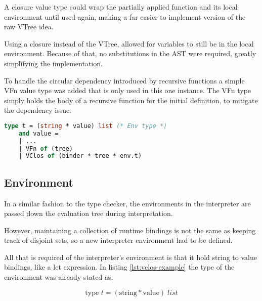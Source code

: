 \documentclass{l4proj}
\begin{document}
A closure value type could wrap the partially applied function and its local environment until used again, making a far easier to implement version of the raw VTree idea.

Using a closure instead of the VTree, allowed for variables to still be in the local environment.
Because of that, no substitutions in the AST were required, greatly simplifying the implementation.


To handle the circular dependency introduced by recursive functions a simple VFn value type was added that is only used in this one instance.
The VFn type simply holds the body of a recursive function for the initial definition, to mitigate the dependency issue.

\begin{lstlisting}[language=Caml, label=lst:vclos-example, caption=The aditional type definitions of a VClos and VFn.]
    type t = (string * value) list (* Env type *)
    and value = 
    | ...
    | VFn of (tree)
    | VClos of (binder * tree * env.t)
\end{lstlisting}

\subsection{Environment}

In a similar fashion to the type checker, the environments in the interpreter are passed down the evaluation tree during interpretation.

However, maintaining a collection of runtime bindings is not the same as keeping track of disjoint sets, so a new interpreter environment had to be defined.

All that is required of the interpreter's environment is that it hold string to value bindings, like a let expression.
In listing \ref{lst:vclos-example} the type of the environment was already stated as:

\[\text{type } t = (\text{string} * \text{value}) \;list\]
\end{document}
